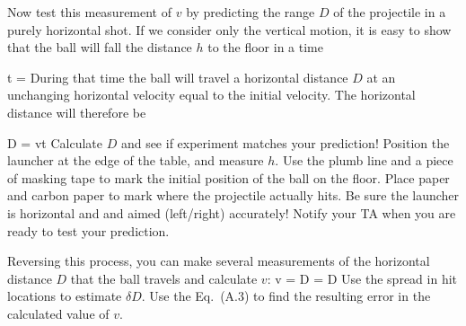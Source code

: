 \item Now test this measurement  of $v$ by predicting the
range $D$ of the projectile in a purely horizontal
shot.
If we consider only the
vertical motion, it is easy to show that the ball will fall the
distance $h$ to the floor in a time

\beq
t = 
\eeq
During that time the ball will
travel a horizontal distance $D$ at an unchanging horizontal
velocity equal to the initial velocity.  The horizontal  distance will therefore be

\beq
D = vt 
\eeq
Calculate $D$ and see if experiment matches your prediction!
Position
the launcher at the edge of the table, and  measure $h$.  Use the
plumb line and a piece of masking tape to mark the initial position of
the ball on the floor.  Place paper and carbon paper to mark
where the projectile actually hits. Be sure the launcher is horizontal and 
and aimed (left/right) accurately!
Notify your TA when you are ready to test
your prediction.

\item Reversing this process, you can make
several measurements of the horizontal distance $D$ that the ball
travels and calculate $v$:
\beq
v = {D\over {}} = D 
\eeq
Use the spread in hit locations to estimate $\delta D$.
Use the Eq.~(A.3) to find the resulting error in the calculated value of
$v$.





